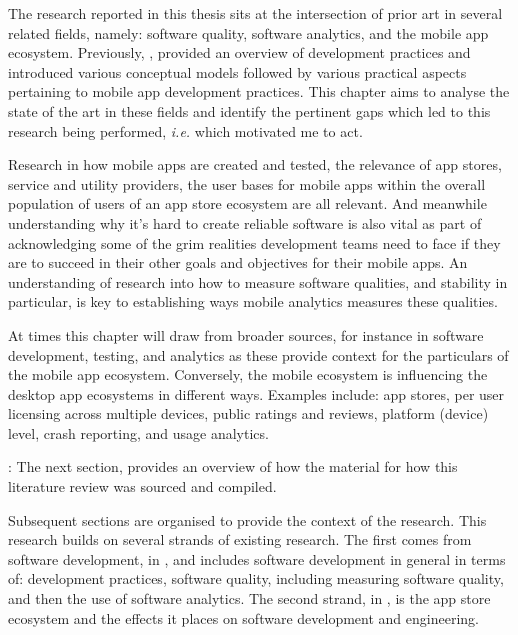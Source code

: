 The research reported in this thesis sits at the intersection of prior art in several related fields, namely: software quality, software analytics, and the mobile app ecosystem. %
Previously, , provided an overview of development practices and introduced various conceptual models followed by various practical aspects pertaining to mobile app development practices.  
This chapter aims to analyse the state of the art in these fields and identify the pertinent gaps which led to this research being performed, \emph{i.e.} which motivated me to act.  

Research in how mobile apps are created and tested, the relevance of app stores, service and utility providers, the user bases for mobile apps within the overall population of users of an app store ecosystem are all relevant. And meanwhile understanding why it's hard to create reliable software is also vital as part of acknowledging some of the grim realities development teams need to face if they are to succeed in their other goals and objectives for their mobile apps. An understanding of research into how to measure software qualities, and stability in particular, is key to establishing ways mobile analytics measures these qualities. 

At times this chapter will draw from broader sources, 
for instance in software development, testing, and analytics as these provide context for the particulars of the mobile app ecosystem. Conversely, the mobile ecosystem is influencing the desktop app ecosystems in different ways.  
Examples include: app stores, per user licensing across multiple devices, public ratings and reviews, platform (device) level, crash reporting, and usage analytics.

: 
The next section,  provides an overview of how the material for how this literature review was sourced and compiled.

Subsequent sections are organised to provide the context of the research. This research builds on several strands of existing research. The first comes from software development, in , and includes software development in general in terms of: development practices, software quality, including measuring software quality, and then the use of software analytics. The second strand, in , is the app store ecosystem and the effects it places on software development and engineering.

